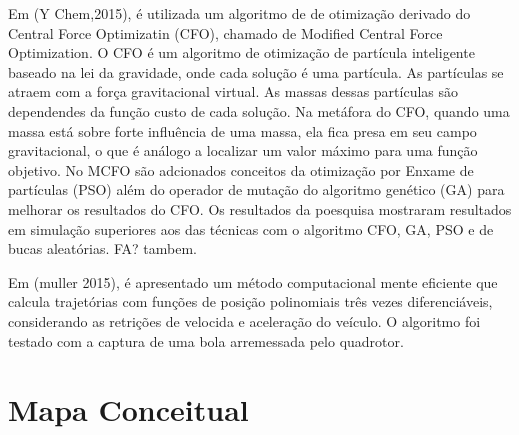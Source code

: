 Em (Y Chem,2015), é utilizada um algoritmo de de otimização derivado do Central Force Optimizatin (CFO), chamado de Modified Central Force Optimization. O CFO é um algoritmo de otimização de partícula inteligente baseado na lei da gravidade, onde cada solução é uma partícula. As partículas se atraem com a força gravitacional virtual. As massas dessas partículas são dependendes da função custo de cada solução. Na metáfora do CFO, quando uma massa está sobre forte influência de uma massa, ela fica presa em seu campo gravitacional, o que é análogo a localizar um valor máximo para uma função objetivo.
No MCFO são adcionados conceitos da otimização por Enxame de partículas (PSO) além do operador de mutação do algoritmo genético (GA) para melhorar os resultados do CFO. Os resultados da poesquisa mostraram resultados em simulação superiores aos das técnicas com o algoritmo CFO, GA, PSO e de bucas aleatórias. FA? tambem.

Em (muller 2015), é apresentado um método computacional mente eficiente que calcula trajetórias com funções de posição polinomiais três vezes diferenciáveis, considerando as retrições de velocida e aceleração do veículo. O algoritmo foi testado com a captura de uma bola arremessada pelo quadrotor.
 



\section{Mapa Conceitual}
